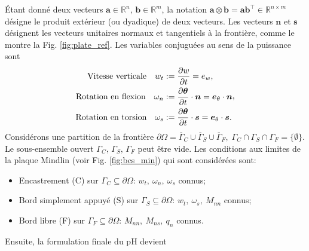 Étant donné deux vecteurs $\bm{a} \in \mathbb{R}^n, \, \bm{b} \in \mathbb{R}^m $, la notation $ \bm{a} \otimes {\bm{b}} = \bm{a} \bm{b}^\top \in \mathbb{R}^{n \times m} $ désigne le produit extérieur (ou dyadique) de deux vecteurs. Les vecteurs $\bm{n} $ et $ \bm{s}$ désignent les vecteurs unitaires normaux et tangentiels à la frontière, comme le montre la Fig. \ref{fig:plate_ref}. Les variables conjuguées au sens de la puissance sont
\begin{equation*} 
\begin{aligned}
\text{Vitesse verticale}  \quad w_t &:= \diffp{w}{t} = e_w, \\
\text{Rotation en flexion} \quad 
\omega_{n} &:= \diffp{\bm{\theta}}{t} \cdot \bm{n} = \bm{e}_\theta \cdot \bm{n} \\
\text{Rotation en torsion} \quad 
\omega_{s} &:= \diffp{\bm{\theta}}{t} \cdot \bm{s} = \bm{e}_\theta \cdot \bm{s}.	
\end{aligned},
\end{equation*}
Considérons une partition de la frontière $\partial\Omega = \overline{\Gamma}_{C} \cup \overline {\Gamma}_{S} \cup \overline {\Gamma}_{F}, \; {\Gamma}_{C} \cap{\Gamma}_{S} \cap {\Gamma}_{F} = \{\emptyset\} $. Le sous-ensemble ouvert $\Gamma_{C}, \, \Gamma_{S}, \, \Gamma_{F} $ peut être vide. Les conditions aux limites de la plaque Mindlin \cite{duran1999approximation} (voir Fig. \ref{fig:bcs_min}) qui sont considérées sont:
\begin{itemize}
\item Encastrement (C) sur $\Gamma_{C} \subseteq \partial \Omega $: $ w_t, \ \omega_{n}, \ \omega_{s}$ connus;
\item Bord simplement appuyé  (S) sur $\Gamma_{S} \subseteq \partial \Omega $: $ w_t, \ \omega_{s}, \ M_{nn} $ connus;
\item  Bord libre (F) sur $ \Gamma_{F} \subseteq \partial \Omega $: $ M_{nn}, \ M_{ns}, \ q_n$ connus.
\end{itemize}
Ensuite, la formulation finale du pH devient
